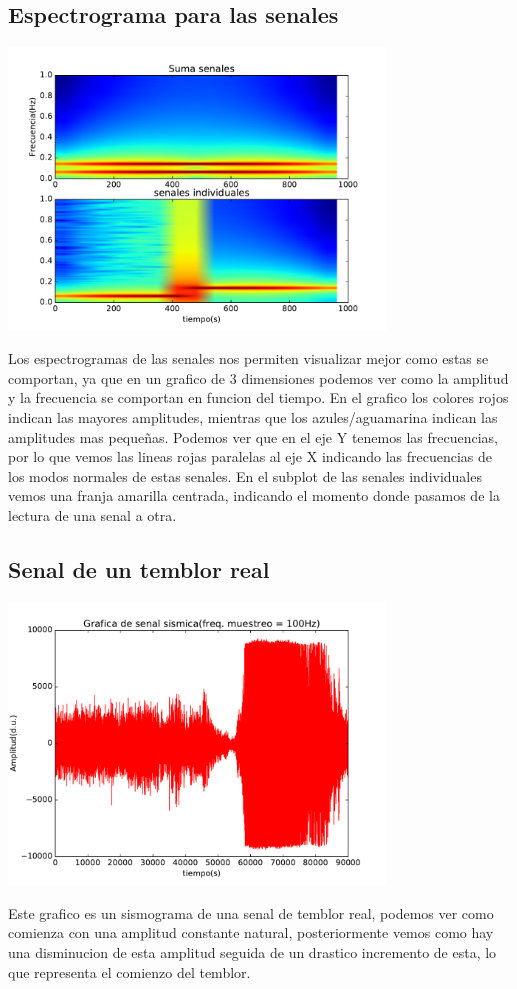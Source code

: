 \documentclass[11pt,letterpaper]{exam}
\begin{document}
\subsection{Espectrograma para las senales}
\begin{center}
\includegraphics[width=10cm]{espectrogramas1.pdf} 
\end{center}
Los espectrogramas de las senales nos permiten visualizar mejor como estas se comportan, ya que en un grafico de 3 dimensiones podemos ver como la amplitud y la frecuencia se comportan en funcion del tiempo. En el grafico los colores rojos indican las mayores amplitudes, mientras que los azules/aguamarina indican las amplitudes mas pequeñas. Podemos ver que en el eje Y tenemos las frecuencias, por lo que vemos las lineas rojas paralelas al eje X indicando las frecuencias de los modos normales de estas senales. En el subplot de las senales individuales vemos una franja amarilla centrada, indicando el momento donde pasamos de la lectura de una senal a otra.

\subsection{Senal de un temblor real}
\begin{center}
\includegraphics[width=10cm]{temblor.pdf} 
\end{center}
Este grafico es un sismograma de una senal de temblor real, podemos ver como comienza con una amplitud constante natural, posteriormente vemos como hay una disminucion de esta amplitud seguida de un drastico incremento de esta, lo que representa el comienzo del temblor.
\end{document}
